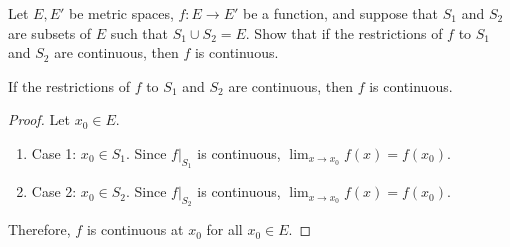 \begin{problem}
  Let $E, E'$ be metric spaces, $f : E \to E'$ be a function,
  and suppose that $S_1$ and $S_2$ are subsets of $E$
  such that $S_1 \cup S_2 = E$.
  Show that if the restrictions of $f$ to $S_1$ and $S_2$ are continuous,
  then $f$ is continuous.

  \begin{answer}
    \begin{claim}
      If the restrictions of $f$ to $S_1$ and $S_2$ are continuous,
      then $f$ is continuous.
      \begin{proof}
        Let $x_0 \in E$.
        \begin{enumerate}
          \item Case 1: $x_0 \in S_1$.
            Since $f|_{S_1}$ is continuous, $\lim_{x \to x_0}{f(x)} = f(x_0)$.
          \item Case 2: $x_0 \in S_2$.
            Since $f|_{S_2}$ is continuous, $\lim_{x \to x_0}{f(x)} = f(x_0)$.
        \end{enumerate}
        Therefore, $f$ is continuous at $x_0$ for all $x_0 \in E$.
      \end{proof}
    \end{claim}
  \end{answer}
\end{problem}
